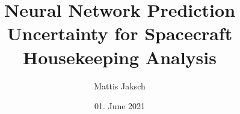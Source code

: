 \documentclass[10pt]{beamer}
\title{Neural Network Prediction Uncertainty for Spacecraft Housekeeping Analysis}
\author{Mattis Jaksch}
\institute{University of Bremen}
\date[01.06.2021]{01. June 2021}
\begin{document}
\begin{frame}
  \titlepage
\end{frame}

\begin{frame}
  \tableofcontents
\end{frame}



\scriptsize

\end{document}
